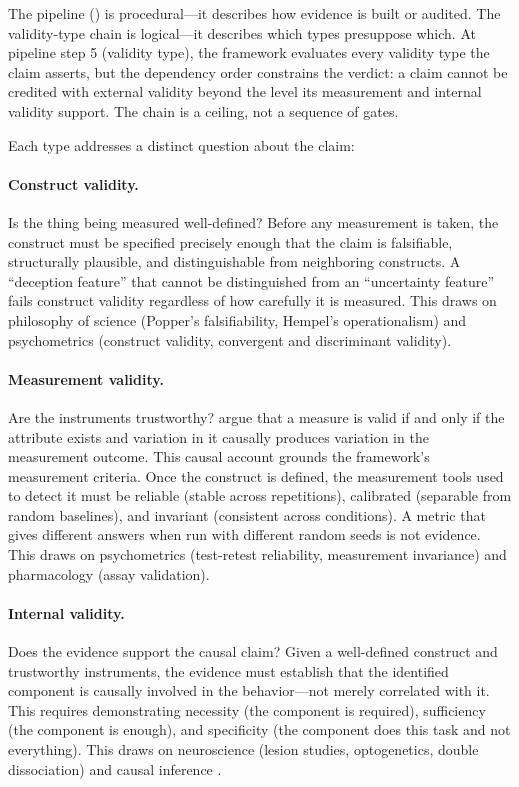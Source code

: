 \documentclass{article}
\begin{document}
The pipeline () is procedural---it describes how evidence is built or audited. The validity-type chain is logical---it describes which types presuppose which. At pipeline step 5 (validity type), the framework evaluates every validity type the claim asserts, but the dependency order constrains the verdict: a claim cannot be credited with external validity beyond the level its measurement and internal validity support. The chain is a ceiling, not a sequence of gates.

Each type addresses a distinct question about the claim:

\paragraph{Construct validity.} Is the thing being measured well-defined? Before any measurement is taken, the construct must be specified precisely enough that the claim is falsifiable, structurally plausible, and distinguishable from neighboring constructs. A ``deception feature'' that cannot be distinguished from an ``uncertainty feature'' fails construct validity regardless of how carefully it is measured. This draws on philosophy of science (Popper's falsifiability, Hempel's operationalism) and psychometrics (construct validity, convergent and discriminant validity).

\paragraph{Measurement validity.} Are the instruments trustworthy? \citet{borsboom2004concept} argue that a measure is valid if and only if the attribute exists and variation in it causally produces variation in the measurement outcome. This causal account grounds the framework's measurement criteria. Once the construct is defined, the measurement tools used to detect it must be reliable (stable across repetitions), calibrated (separable from random baselines), and invariant (consistent across conditions). A metric that gives different answers when run with different random seeds is not evidence. This draws on psychometrics (test-retest reliability, measurement invariance) and pharmacology (assay validation).

\paragraph{Internal validity.} Does the evidence support the causal claim? Given a well-defined construct and trustworthy instruments, the evidence must establish that the identified component is causally involved in the behavior---not merely correlated with it. This requires demonstrating necessity (the component is required), sufficiency (the component is enough), and specificity (the component does this task and not everything). This draws on neuroscience (lesion studies, optogenetics, double dissociation) and causal inference \citep{pearl2009causality}.
\end{document}

